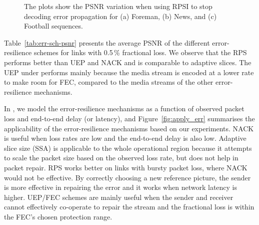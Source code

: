 \begin{figure}[!t]
\caption{The plots show the PSNR variation when using RPSI to stop decoding
error propagation for (a) Foreman, (b) News, and (c) Football sequences.}
\label{fig:rpsi_sim}
\end{figure}

Table~\ref{tab:err-sch-psnr} presents the average PSNR of the different
error-resilience schemes for links with 0.5\,\% fractional loss. We observe that the
RPS performs better than UEP and NACK and is comparable to adaptive slices.
The UEP under performs mainly because the media stream is encoded at a lower
rate to make room for FEC, compared to the media streams of the other
error-resilience mechanisms.

\begin{table}
\caption{Comparing the performance of different error-resilience
schemes on three different types of YUV sequences~\cite{YUV_seq}. The link
loss rate is 0.5\,\% at each 3G link.}
\label{tab:err-sch-psnr}
\end{table}

In , we model the error-resilience mechanisms as a function of
observed packet loss and end-to-end delay (or latency), and
Figure~\ref{fig:apply_err} summarises the applicability of the
error-resilience mechanisms based on our experiments. NACK is useful when loss
rates are low and the end-to-end delay is also low. Adaptive slice size (SSA)
is applicable to the whole operational region because it attempts to scale the
packet size based on the observed loss rate, but does not help in packet
repair. RPS works better on links with bursty packet loss, where NACK would
not be effective. By correctly choosing a new reference picture, the sender is
more effective in repairing the error and it works when network latency is higher.
UEP/FEC schemes are mainly useful when the sender and receiver cannot effectively
co-operate to repair the stream and the fractional loss is within the FEC's chosen
protection range.

